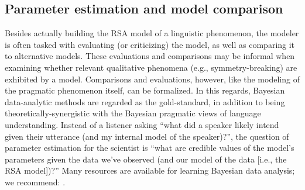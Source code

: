 \documentclass{sp}
\newcommand{\gcs}[1]{\textcolor{blue}{[gcs: #1]}}
\newcommand{\mht}[1]{\textcolor{purple}{[mht: #1]}}
\begin{document}




\subsection{Parameter estimation and model comparison}

Besides actually building the RSA model of a linguistic phenomenon, the modeler is often tasked with evaluating (or criticizing) the model, as well as comparing it to alternative models.
These evaluations and comparisons may be informal when examining whether relevant qualitative phenomena (e.g., symmetry-breaking) are exhibited by a model.
Comparisons and evaluations, however, like the modeling of the pragmatic phenomenon itself, can be formalized. 
In this regards, Bayesian data-analytic methods are regarded as the gold-standard, in addition to being theoretically-synergistic with the Bayesian pragmatic views of language understanding.
Instead of a listener asking ``what did a speaker likely intend given their utterance (and my internal model of the speaker)?'', the question of parameter estimation for the scientist is ``what are credible values of the model's parameters given the data we've observed (and our model of the data [i.e., the RSA model])?''
Many resources are available for learning Bayesian data analysis; we recommend: \cite{gelman2013bayesian, kruschke2014doing, lee2014bayesian,Lambert2018:A-Students-Guid}.
\end{document}
